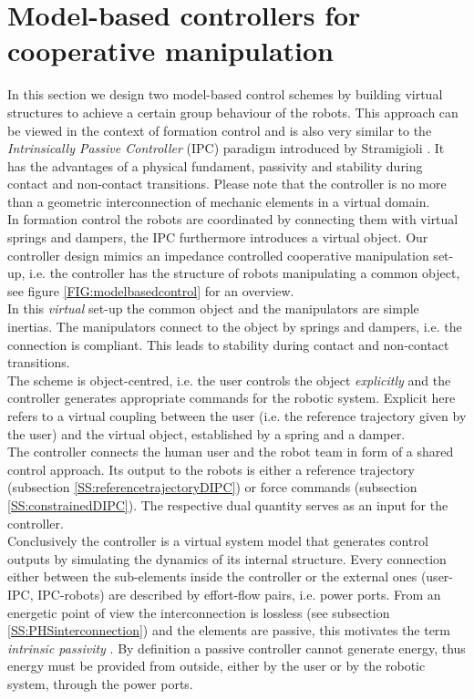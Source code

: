 \documentclass[a4paper,twoside, openright,12pt]{report}
\begin{document}
{\section{Model-based controllers for cooperative manipulation}\label{S:modelbasedcontrol}
In this section we design two model-based control schemes by building virtual structures to achieve a certain group behaviour of the robots. This approach can be viewed in the context of formation control and is also very similar to the \emph{Intrinsically Passive Controller} (IPC) paradigm introduced by Stramigioli \cite{Stramigioli_01}. It has the advantages of a physical fundament, passivity and stability during contact and non-contact transitions. Please note that the controller is no more than a geometric interconnection of mechanic elements in a virtual domain.\\
In formation control the robots are coordinated by connecting them with virtual springs and dampers, the IPC furthermore introduces a virtual object.
Our controller design mimics an impedance controlled cooperative manipulation set-up, i.e. the controller has the structure of robots manipulating a common object, see figure \ref{FIG:modelbasedcontrol} for an overview.\\
In this \emph{virtual} set-up the common object and the manipulators are simple inertias. The manipulators connect to the object by springs and dampers, i.e. the connection is compliant. This leads to stability during contact and non-contact transitions.\\
The scheme is object-centred, i.e. the user controls the object \emph{explicitly} and the controller generates appropriate commands for the robotic system. Explicit here refers to a virtual coupling between the user (i.e. the reference trajectory given by the user) and the virtual object, established by a spring and a damper.\\
The controller connects the human user and the robot team in form of a shared control approach. Its output to the robots is either a reference trajectory (subsection \ref{SS:referencetrajectoryDIPC}) or force commands (subsection \ref{SS:constrainedDIPC}). The respective dual quantity serves as an input for the controller.\\
Conclusively the controller is a virtual system model that generates control outputs by simulating the  dynamics of its internal structure. 
Every connection either between the sub-elements inside the controller or the external ones (user-IPC, IPC-robots) are described by effort-flow pairs, i.e. power ports. From an energetic point of view the interconnection is lossless (see subsection \ref{SS:PHSinterconnection}) and the elements are passive, this motivates the term \emph{intrinsic passivity} \cite{Stramigioli_01}. By definition a passive controller cannot generate energy, thus energy must be provided from outside, either by the user or by the robotic system, through the power ports.\\
}
\end{document}
